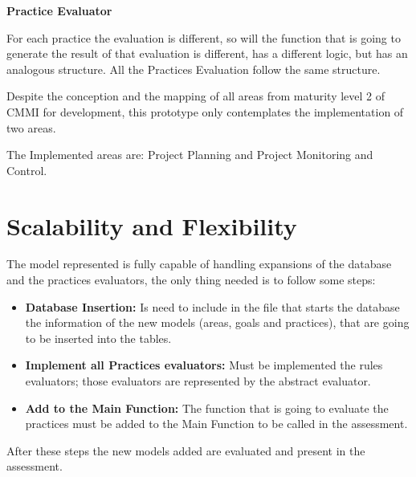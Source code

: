 \vspace{1cm}

\textbf{Practice Evaluator}

For each practice the evaluation is different, so will the function that is going to generate the result of that evaluation is different, has a different logic, but has an analogous structure. All the Practices Evaluation follow the same structure.

\vspace{1cm}

Despite the conception and the mapping of all areas from maturity level 2 of CMMI for development, this prototype only contemplates the implementation of two areas.

The Implemented areas are: Project Planning and Project Monitoring and Control.

\section{Scalability and Flexibility}

The model represented is fully capable of handling expansions of the database and the practices evaluators, the only thing needed is to follow some steps:
\begin{itemize}
	\item \textbf{Database Insertion: } Is need to include in the file that starts the database the information of the new models (areas, goals and practices), that are going to be inserted into the tables.
	\item \textbf{Implement all Practices evaluators: } Must be implemented the rules evaluators; those evaluators are represented by the abstract evaluator.
	\item \textbf{Add to the Main Function: } The function that is going to evaluate the practices must be added to the Main Function to be called in the assessment.
\end{itemize}

After these steps the new models added are evaluated and present in the assessment.
